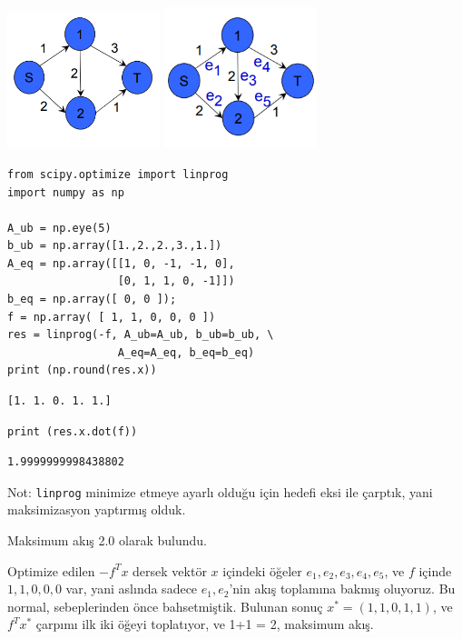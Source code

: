\documentclass[12pt,fleqn]{article}\usepackage{../../common}
\begin{document}
\includegraphics[width=12em]{func_55_duality_04.png}
\includegraphics[width=12em]{func_55_duality_05.png}

\begin{verbatim}
from scipy.optimize import linprog
import numpy as np

A_ub = np.eye(5)
b_ub = np.array([1.,2.,2.,3.,1.])
A_eq = np.array([[1, 0, -1, -1, 0],
                 [0, 1, 1, 0, -1]])
b_eq = np.array([ 0, 0 ]);
f = np.array( [ 1, 1, 0, 0, 0 ])
res = linprog(-f, A_ub=A_ub, b_ub=b_ub, \
                 A_eq=A_eq, b_eq=b_eq)
print (np.round(res.x))
\end{verbatim}

\begin{verbatim}
[1. 1. 0. 1. 1.]
\end{verbatim}

\begin{verbatim}
print (res.x.dot(f))
\end{verbatim}

\begin{verbatim}
1.9999999998438802
\end{verbatim}

Not: \verb!linprog! minimize etmeye ayarlı olduğu için hedefi eksi ile
çarptık, yani maksimizasyon yaptırmış olduk.

Maksimum akış 2.0 olarak bulundu. 

Optimize edilen $-f^T x$ dersek vektör $x$ içindeki öğeler
$e_1,e_2,e_3,e_4,e_5$, ve $f$ içinde $1,1,0,0,0$ var, yani aslında sadece
$e_1,e_2$'nin akış toplamına bakmış oluyoruz. Bu normal, sebeplerinden önce
bahsetmiştik. Bulunan sonuç $x^\ast = (1,1,0,1,1)$, ve $f^Tx^\ast$ çarpımı ilk
iki öğeyi toplatıyor, ve 1+1 = 2, maksimum akış.
\end{document}
